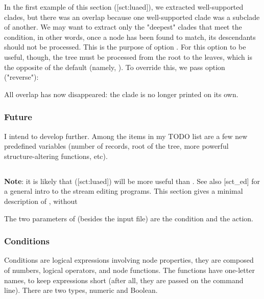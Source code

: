 \startalignment[center]
\externalfigure[ed_21_svg]
\stopalignment 


In the first example of this section (\in{}[sct:luaed]), we extracted
well-supported clades, but there was an overlap because one well-supported clade
was a subclade of another. We may want to extract only the "deepest" clades that
meet the condition, in other words, once a node has been found to match, its
descendants should not be processed. This is the purpose of option .
For this option to be useful, though, the tree must be processed from the root
to the leaves, which is the opposite of the default (namely, \no). To override
this, we pass option  ("reverse"):

\page[no]


All overlap has now disappeared: the
 clade is no longer printed on its own. 

\subsubsection{Future}

I intend to develop \luaed{} further. Among the items in my TODO list are a few
new predefined variables (number of records, root of the tree, more powerful
structure-altering functions, etc).

\subsection{\ed}

{\bf Note}: it is likely that \luaed{} (\in{}[sct:luaed]) will be more useful
than \ed. See also [sct_ed] for a general intro to the stream
editing programs. This section gives a minimal description of \ed, without

The two parameters of \ed{} (besides the input file) are the
condition and the action. 

\subsubsection{Conditions}

Conditions are logical expressions involving node properties, they are composed
of numbers, logical operators, and node functions.  The functions have
one-letter names, to keep expressions short (after all, they are passed on the
command line). There are two types, numeric and Boolean.

